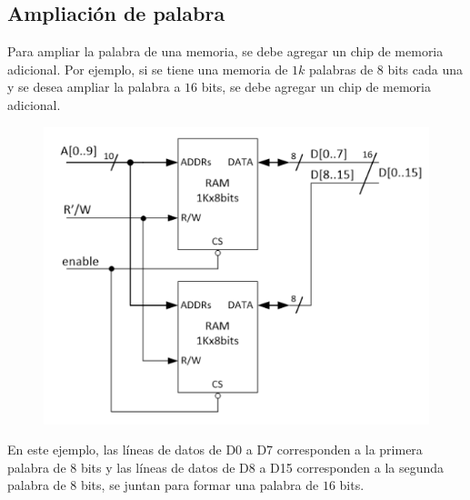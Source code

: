 \subsection{Ampliación de palabra}
Para ampliar la palabra de una memoria, se debe agregar un chip de memoria adicional. Por ejemplo, si se tiene una memoria de $1k$ palabras de $8$ bits cada una y se desea ampliar la palabra a $16$ bits, se debe agregar un chip de memoria adicional.

\begin{figure}[h]
    \centering
    \includegraphics[scale=0.8]{img/memparalelo.png}
\end{figure}

En este ejemplo, las líneas de datos de D0 a D7 corresponden a la primera palabra de $8$ bits y las líneas de datos de D8 a D15 corresponden a la segunda palabra de $8$ bits, se juntan para formar una palabra de $16$ bits.